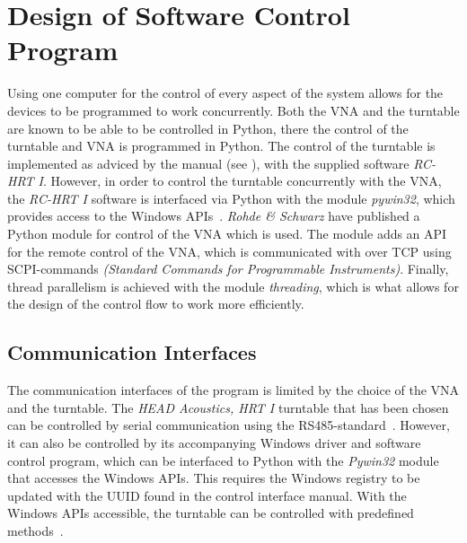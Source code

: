 \section{Design of Software Control Program}
Using one computer for the control of every aspect of the system allows for the devices to be programmed to work concurrently. Both the VNA and the turntable are known to be able to be controlled in Python, there the control of the turntable and VNA is programmed in Python. The control of the turntable is implemented as adviced by the manual (see \cite{hrt_i_manual}), with the supplied software \textit{RC-HRT I}. However, in order to control the turntable concurrently with the VNA, the \textit{RC-HRT I} software is interfaced via Python with the module \textit{pywin32}, which provides access to the Windows APIs~\cite{pywin32}. \textit{Rohde \& Schwarz} have published a Python module for control of the VNA which is used. The module adds an API for the remote control of the VNA, which is communicated with over TCP using SCPI-commands \textit{(Standard Commands for Programmable Instruments)}. Finally, thread parallelism is achieved with the module \textit{threading}, which is what allows for the design of the control flow to work more efficiently.



\subsection{Communication Interfaces} \label{ss:com_interface}
The communication interfaces of the program is limited by the choice of the VNA and the turntable. The \textit{HEAD Acoustics, HRT I} turntable that has been chosen can be controlled by serial communication using the RS485-standard~\cite{hrt_i_data_sheet}. However, it can also be controlled by its accompanying Windows driver and software control program, which can be interfaced to Python with the \textit{Pywin32} module that accesses the Windows APIs. This requires the Windows registry to be updated with the UUID found in the control interface manual. With the Windows APIs accessible, the turntable can be controlled with predefined methods~\cite{hrt_control_api_manual}. 


